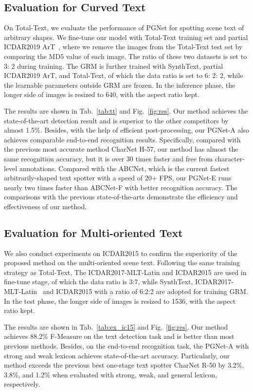 \documentclass[letterpaper]{article} \usepackage{aaai21}  \usepackage{times}  \usepackage{helvet} \usepackage{courier}  \usepackage[hyphens]{url}  \usepackage{graphicx} \urlstyle{rm} \def\UrlFont{\rm}  \usepackage{natbib}  \usepackage{caption} \usepackage{bm}
\begin{document}
\subsection{Evaluation for Curved Text}
On Total-Text, we evaluate the performance of PGNet for spotting scene text of arbitrary shapes. We fine-tune our model with Total-Text training set and partial ICDAR2019 ArT~\cite{icdar19art}, where we remove the images from the Total-Text test set by comparing the MD5 value of each image. The ratio of these two datasets is set to 3: 2 during training. The GRM is further trained with SynthText, partial ICDAR2019 ArT, and Total-Text, of which the data ratio is set to 6: 2: 2, while the learnable parameters outside GRM are frozen. In the inference phase, the longer side of images is resized to 640, with the aspect ratio kept.

The results are shown in Tab.~\ref{tab:tt} and Fig.~\ref{fig:res}. Our method achieves the state-of-the-art detection result and is superior to the other competitors by almost 1.5\%. Besides, with the help of efficient post-processing, our PGNet-A also achieves comparable end-to-end recognition results. Specifically, compared with the previous most accurate method CharNet H-57, our method has almost the same recognition accuracy, but it is over 30 times faster and free from character-level annotations. Compared with the ABCNet, which is the current fastest arbitrarily-shaped text spotter with a speed of 20+ FPS, our PGNet-E runs nearly two times faster than ABCNet-F with better recognition accuracy. The comparisons with the previous state-of-the-arts demonstrate the efficiency and effectiveness of our method.

\subsection{Evaluation for Multi-oriented Text} We also conduct experiments on ICDAR2015 to confirm the superiority of the proposed method on the multi-oriented scene text. Following the same training strategy as Total-Text, The ICDAR2017-MLT-Latin and ICDAR2015 are used in fine-tune stage, of which the data ratio is 3:7, while SynthText, ICDAR2017-MLT-Latin~\cite{nayef2017icdar2017} and ICDAR2015 with a ratio of 6:2:2 are adopted for training GRM. In the test phase, the longer side of images is resized to 1536, with the aspect ratio kept.

The results are shown in Tab.~\ref{tab:ex_ic15} and Fig.~\ref{fig:res}. Our method achieves 88.2\% F-Measure on the text detection task and is better than most previous methods. Besides, on the end-to-end recognition task, the PGNet-A with strong and weak lexicon achieves state-of-the-art accuracy. Particularly, our method exceeds the previous best one-stage text spotter CharNet R-50 by 3.2\%, 3.8\%, and 1.2\%  when evaluated with strong, weak, and general lexicon, respectively.
\end{document}
